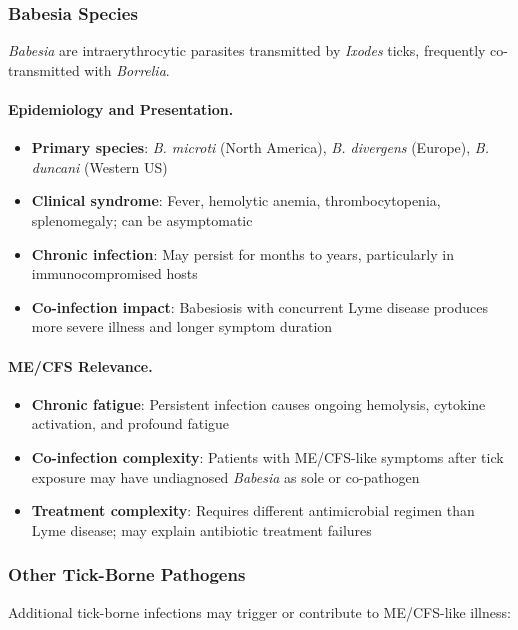 \subsubsection{Babesia Species}

\emph{Babesia} are intraerythrocytic parasites transmitted by \emph{Ixodes} ticks, frequently co-transmitted with \emph{Borrelia}.

\paragraph{Epidemiology and Presentation.}
\begin{itemize}
    \item \textbf{Primary species}: \emph{B. microti} (North America), \emph{B. divergens} (Europe), \emph{B. duncani} (Western US)
    \item \textbf{Clinical syndrome}: Fever, hemolytic anemia, thrombocytopenia, splenomegaly; can be asymptomatic
    \item \textbf{Chronic infection}: May persist for months to years, particularly in immunocompromised hosts
    \item \textbf{Co-infection impact}: Babesiosis with concurrent Lyme disease produces more severe illness and longer symptom duration~\cite{Krause1996babesia}
\end{itemize}

\paragraph{ME/CFS Relevance.}
\begin{itemize}
    \item \textbf{Chronic fatigue}: Persistent infection causes ongoing hemolysis, cytokine activation, and profound fatigue
    \item \textbf{Co-infection complexity}: Patients with ME/CFS-like symptoms after tick exposure may have undiagnosed \emph{Babesia} as sole or co-pathogen
    \item \textbf{Treatment complexity}: Requires different antimicrobial regimen than Lyme disease; may explain antibiotic treatment failures
\end{itemize}

\subsubsection{Other Tick-Borne Pathogens}

Additional tick-borne infections may trigger or contribute to ME/CFS-like illness:

